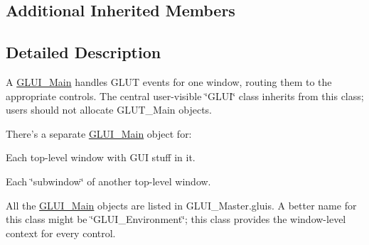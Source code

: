 \subsection*{Additional Inherited Members}


\subsection{Detailed Description}
A \hyperlink{class_g_l_u_i___main}{G\+L\+U\+I\+\_\+\+Main} handles G\+L\+U\+T events for one window, routing them to the appropriate controls. The central user-\/visible \char`\"{}\+G\+L\+U\+I\char`\"{} class inherits from this class; users should not allocate G\+L\+U\+T\+\_\+\+Main objects.

There's a separate \hyperlink{class_g_l_u_i___main}{G\+L\+U\+I\+\_\+\+Main} object for\+:
\begin{DoxyItemize}
\item Each top-\/level window with G\+U\+I stuff in it.
\end{DoxyItemize}

Each \char`\"{}subwindow\char`\"{} of another top-\/level window.

All the \hyperlink{class_g_l_u_i___main}{G\+L\+U\+I\+\_\+\+Main} objects are listed in G\+L\+U\+I\+\_\+\+Master.\+gluis. A better name for this class might be \char`\"{}\+G\+L\+U\+I\+\_\+\+Environment\char`\"{}; this class provides the window-\/level context for every control. 

